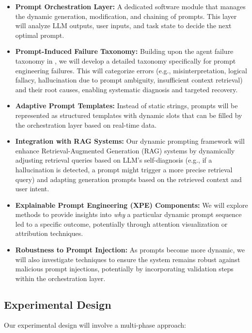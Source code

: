 \documentclass{article}
\begin{document}
\begin{itemize}
    \item \textbf{Prompt Orchestration Layer:} A dedicated software module that manages the dynamic generation, modification, and chaining of prompts. This layer will analyze LLM outputs, user inputs, and task state to decide the next optimal prompt.
    \item \textbf{Prompt-Induced Failure Taxonomy:} Building upon the agent failure taxonomy in \cite{paper1_agents}, we will develop a detailed taxonomy specifically for prompt engineering failures. This will categorize errors (e.g., misinterpretation, logical fallacy, hallucination due to prompt ambiguity, insufficient context retrieval) and their root causes, enabling systematic diagnosis and targeted recovery.
    \item \textbf{Adaptive Prompt Templates:} Instead of static strings, prompts will be represented as structured templates with dynamic slots that can be filled by the orchestration layer based on real-time data.
    \item \textbf{Integration with RAG Systems:} Our dynamic prompting framework will enhance Retrieval-Augmented Generation (RAG) systems \cite{paper5_legalrag} by dynamically adjusting retrieval queries based on LLM's self-diagnosis (e.g., if a hallucination is detected, a prompt might trigger a more precise retrieval query) and adapting generation prompts based on the retrieved context and user intent.
    \item \textbf{Explainable Prompt Engineering (XPE) Components:} We will explore methods to provide insights into \textit{why} a particular dynamic prompt sequence led to a specific outcome, potentially through attention visualization or attribution techniques.
    \item \textbf{Robustness to Prompt Injection:} As prompts become more dynamic, we will also investigate techniques to ensure the system remains robust against malicious prompt injections, potentially by incorporating validation steps within the orchestration layer.
\end{itemize}

\subsection{Experimental Design}
Our experimental design will involve a multi-phase approach:
\end{document}
